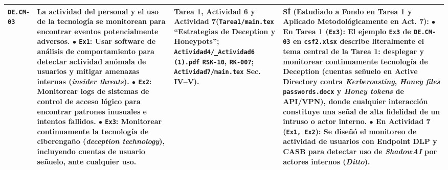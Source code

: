 \documentclass[letterpaper,11pt]{article}
\begin{document}
\begin{longtable}{|C{1.5cm}|L{5.3cm}|L{4.3cm}|L{5.8cm}|}
\texttt{DE.CM-03} &
\textbf{La actividad del personal y el uso de la tecnología se monitorean para encontrar eventos potencialmente adversos.}\newline
$\bullet$ \texttt{Ex1}: Usar software de análisis de comportamiento para detectar actividad anómala de usuarios y mitigar amenazas internas (\textit{insider threats}).\newline
$\bullet$ \texttt{Ex2}: Monitorear logs de sistemas de control de acceso lógico para encontrar patrones inusuales e intentos fallidos.\newline
$\bullet$ \texttt{Ex3}: \textbf{Monitorear continuamente la tecnología de ciberengaño (\textit{deception technology}), incluyendo cuentas de usuario señuelo, ante cualquier uso}. &
\textbf{Tarea 1, Actividad 6 y Actividad 7}\newline (\texttt{Tarea1/main.tex} ``Estrategias de Deception y Honeypots''; \texttt{Actividad4/\_Actividad6 (1).pdf} \texttt{RSK-10}, \texttt{RK-007}; \texttt{Actividad7/main.tex} Sec. IV--V). &
\textbf{SÍ (Estudiado a Fondo en Tarea 1 y Aplicado Metodológicamente en Act. 7):}\newline
$\bullet$ \textbf{En Tarea 1 (\texttt{Ex3}):} El ejemplo \texttt{Ex3} de \texttt{DE.CM-03} en \texttt{csf2.xlsx} describe literalmente el tema central de la \textbf{Tarea 1}: desplegar y monitorear continuamente tecnología de \textbf{Deception} (cuentas señuelo en Active Directory contra \textit{Kerberoasting}, \textit{Honey files} \texttt{passwords.docx} y \textit{Honey tokens} de API/VPN), donde cualquier interacción constituye una señal de alta fidelidad de un intruso o actor interno.\newline
$\bullet$ \textbf{En Actividad 7 (\texttt{Ex1, Ex2}):} Se diseñó el monitoreo de actividad de usuarios con Endpoint DLP y CASB para detectar uso de \textit{ShadowAI} por actores internos (\textit{Ditto}). \\
\hline


\end{longtable}
\end{document}
